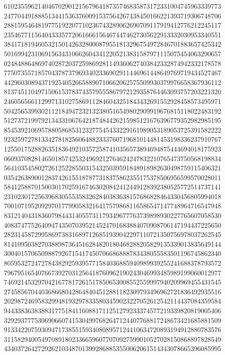 {{    6102355962140467029012156796418735746835873172331004745963339773 ~
    2477044918885134415363760091537564267438450166221393719306748706 ~
    2881595464819775192207710236743289062690709117919412776212245117 ~
    2354677115640433357720616661564674474627305622913332030953340551 ~
    3841718194605321501426328000879551813296754972846701883657425342 ~
    5016994231069156343106626043412205213831587971115075454063290657 ~
    0248488648697402872037259869281149360627403842332874942332178578 ~
    7750735571857043787379693402336902911446961448649769719434527467 ~
    4429603089437192540526658890710662062575509930379976658367936112 ~
    8137451104971506153783743579555867972129358764463093757203221320 ~
    2460565661129971310275869112846043251843432691552928458573495971 ~
    5042565399302112184947232132380516549802909919676815118022483192 ~
    5127372199792134331067642187484426215985121676396779352982985195 ~
    8545392106957880586853123277545433229161989053189053725391582222 ~
    9232597278133427818256064882333760719681014481453198336237910767 ~
    1255017528826351836492103572587410356573894694875444694018175923 ~
    0609370828146501857425324969212764624247832210765473750568198834 ~
    5641035458027261252285503154325039591848918982630498759115406321 ~
    0354263890012837426155187877318375862355175378506956599570028011 ~
    5841258870150030170259167463020842412449128392380525772514737141 ~
    2310230172563968305553583262840383638157686828464330456805994018 ~
    7001071952092970177990583216417579868116586547147748964716547948 ~
    8312140431836079844314055731179349677763739898930227765607058530 ~
    4083747752640947435070395214524701683884070908706147194437225650 ~
    2823145872995869738316897126851939042297110721350756978037262545 ~
    8141095038270388987364516284820180468288205829135339013835649144 ~
    3004015706509887926715417450706686888783438055583501196745862340 ~
    8059532724727843829259395771584036885940989939255241688378793572 ~
    7967951654076673927031256418760962190243046993485989199060012977 ~
    7469214532970421677817261517850653008552559997940209969455431545 ~
    2745856704403686680428648404512881182309793496962721836492935516 ~
    2029872469583299481932978335803459023227052612542114437084359584 ~
    9443383638388317751841160881711251279233374577219339820819005406 ~
    3292937775306906607415304997682647124407768817248673421685881509 ~
    9133422075930947173855159340808957124410634720893194912880783576 ~
    3115829400549708918023366596077070927599010527028150868897828549 ~
    4340372642729262103487013992868853550062061514343078665396085995 ~
}}
